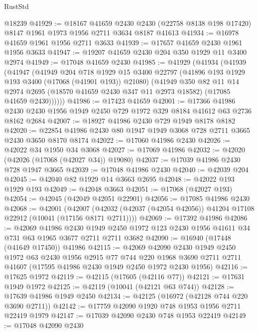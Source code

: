 \begin{lexlean}{RustStd}
\begin{coremodule}
    @18239
@41929 := @18167
    @41659
    @2430
    @2430
    (@22758 @8138 @198 @17420)
    @8147
    @1961
    @1973
    @1956
    @2711
    @3634
    @8187
    @41613
@41934 := @16978 @41659 @1961 @1956 @2711 @3633
@41939 := @17657 @41659 @2430 @1961 @1956 @3633
@41947 := @19207 @41659 @2430 @204 @350 @1929 @11 @3400 @2974
@41949 := @17048 @41659 @2430
@41985 := @41929
    (@41934
      (@41939
        (@41947
          (@41949
            @204
            @718
            @1929
            @15
            @3400
            @22797
            (@41896 @193 @1929 @193 @3400 (@17068 (@41901 @193)) @21080)
            (@41949
              @350
              @82
              @11
              @14
              @2974
              @2695
              (@18570 @41659 @2430 @347 @11 @2973 @18582)
              (@17085 @41659 @2430))))))
@41986 := @17423 @41659
@42001 := @17366
    @41986
    @2430
    @2430
    @1956
    @1949
    @2450
    @729
    @1972
    @329
    @8184
    @41612
    @63
    @2736
    @8162
    @2684
@42007 := @18927 @41986 @2430 @729 @1949 @8178 @8182
@42020 := @22854 @41986 @2430 @80 @1947 @1949 @3068 @728 @2711 @3665 @2430 @3650 @8170 @8174
@42022 := @17060 @41986 @2430
@42026 := @42022 @34 @1950 @34 @3068
@42027 := @17069 @41986
@42032 := @42020 (@42026 (@17068 (@42027 @34)) @19080)
@42037 := @17039 @41986 @2430 @728 @1947 @3665
@42039 := @17048 @41986 @2430
@42040 := @42039 @204
@42045 := @42040 @82 @1929 @14 @3663 @2695
@42048 := @42022 @193 @1929 @193
@42049 := @42048 @3663
@42051 := @17068 (@42027 @193)
@42054 := @42045 (@42049 @42051 @22901)
@42056 := @17085 @41986 @2430
@42068 := @42001
    (@42007 (@42032 (@42037 (@42054 @42056)) @41204 @17108 @22912 (@10041 (@17156 @8171 @2711))))
@42069 := @17392 @41986
@42086 := @42069
    @41986
    @2430
    @1949
    @2450
    @1972
    @123
    @2430
    @1956
    @41611
    @34
    @731
    @63
    @1965
    @3677
    @2711
    @2711
    @3682
@42090 := @16940 (@17448 (@41649 @17450)) @41986
@42115 := @42069
    @42090
    @2430
    @1949
    @2450
    @1972
    @63
    @2430
    @1956
    @2915
    @77
    @744
    @220
    @1968
    @3690
    @2711
    @2711
    @41607
    (@17595 @41986 @2430 @1949 @2450 @1972 @2430 @1956)
@42116 := @17625 @1972
@42119 := @42115 (@17605 (@42116 @77))
@42121 := @17631 @1949 @1972
@42125 := @42119 (@10041 (@42121 @63 @744))
@42128 := @17639 @41986 @1949 @2450
@42134 := @42125 (@16972 (@42128 @744 @220 @3690 @2711))
@42142 := @17759 @42090 @1920 @748 @1953 @1956 @2711 @22419 @1979
@42147 := @17039 @42090 @2430 @748 @1953 @22419
@42149 := @17048 @42090 @2430

\end{coremodule}
\end{lexlean}
